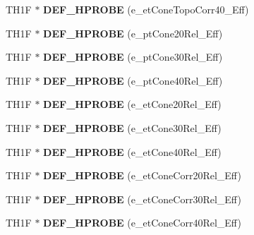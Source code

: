 \begin{DoxyCompactItemize}
\item 
\hypertarget{classHistos__Fake_a16dda66acf5fc2a960640727d59bb428}{
TH1F $\ast$ {\bfseries DEF\_\-HPROBE} (e\_\-etConeTopoCorr40\_\-Eff)}
\label{classHistos__Fake_a16dda66acf5fc2a960640727d59bb428}

\item 
\hypertarget{classHistos__Fake_aab37ebf0b8de21c80f507a08118a0c69}{
TH1F $\ast$ {\bfseries DEF\_\-HPROBE} (e\_\-ptCone20Rel\_\-Eff)}
\label{classHistos__Fake_aab37ebf0b8de21c80f507a08118a0c69}

\item 
\hypertarget{classHistos__Fake_a97e79b56d646d6a77c6b3fdfa7603365}{
TH1F $\ast$ {\bfseries DEF\_\-HPROBE} (e\_\-ptCone30Rel\_\-Eff)}
\label{classHistos__Fake_a97e79b56d646d6a77c6b3fdfa7603365}

\item 
\hypertarget{classHistos__Fake_a10f99ec20e4a82d5e9044c02a40463ee}{
TH1F $\ast$ {\bfseries DEF\_\-HPROBE} (e\_\-ptCone40Rel\_\-Eff)}
\label{classHistos__Fake_a10f99ec20e4a82d5e9044c02a40463ee}

\item 
\hypertarget{classHistos__Fake_a293c0ad6f63d40424f319eca2e84d718}{
TH1F $\ast$ {\bfseries DEF\_\-HPROBE} (e\_\-etCone20Rel\_\-Eff)}
\label{classHistos__Fake_a293c0ad6f63d40424f319eca2e84d718}

\item 
\hypertarget{classHistos__Fake_acc4400775bb96c33bbc29f5c764bcc4f}{
TH1F $\ast$ {\bfseries DEF\_\-HPROBE} (e\_\-etCone30Rel\_\-Eff)}
\label{classHistos__Fake_acc4400775bb96c33bbc29f5c764bcc4f}

\item 
\hypertarget{classHistos__Fake_af1b5667c402002a1244fff671cd428a9}{
TH1F $\ast$ {\bfseries DEF\_\-HPROBE} (e\_\-etCone40Rel\_\-Eff)}
\label{classHistos__Fake_af1b5667c402002a1244fff671cd428a9}

\item 
\hypertarget{classHistos__Fake_a9626ad1060ad5390b9963c92bfd96508}{
TH1F $\ast$ {\bfseries DEF\_\-HPROBE} (e\_\-etConeCorr20Rel\_\-Eff)}
\label{classHistos__Fake_a9626ad1060ad5390b9963c92bfd96508}

\item 
\hypertarget{classHistos__Fake_abae923d2bd995a3a49b4ae48772511a5}{
TH1F $\ast$ {\bfseries DEF\_\-HPROBE} (e\_\-etConeCorr30Rel\_\-Eff)}
\label{classHistos__Fake_abae923d2bd995a3a49b4ae48772511a5}

\item 
\hypertarget{classHistos__Fake_a0490f3692618f1a3eea02ade6923e7a7}{
TH1F $\ast$ {\bfseries DEF\_\-HPROBE} (e\_\-etConeCorr40Rel\_\-Eff)}
\label{classHistos__Fake_a0490f3692618f1a3eea02ade6923e7a7}


\end{DoxyCompactItemize}
